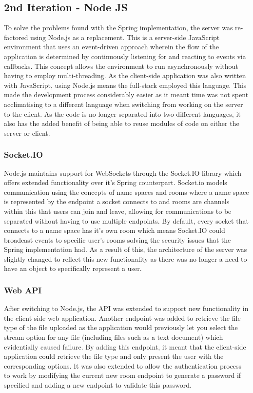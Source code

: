 \documentclass[]{report}
\begin{document}
			\subsection{2nd Iteration - Node JS}
			To solve the problems found with the Spring implementation, the server was re-factored using Node.js as a replacement. This is a server-side JavaScript environment that uses an event-driven approach wherein the flow of the application is determined by continuously listening for and reacting to events via callbacks. This concept allows the environment to run asynchronously without having to employ multi-threading. As the client-side application was also written with JavaScript, using Node.js means the full-stack employed this language. This made the development process considerably easier as it meant time was not spent acclimatising to a different language when switching from working on the server to the client. As the code is no longer separated into two different languages, it also has the added benefit of being able to reuse modules of code on either the server or client.
				\subsubsection{Socket.IO}
				Node.js maintains support for WebSockets through the Socket.IO library which offers extended functionality over it's Spring counterpart. Socket.io models communication using the concepts of name spaces and rooms where a name space is represented by the endpoint a socket connects to and rooms are channels within this that users can join and leave, allowing for communications to be separated without having to use multiple endpoints. By default, every socket that connects to a name space has it's own room which means Socket.IO could broadcast events to specific user's rooms solving the security issues that the Spring implementation had. As a result of this, the architecture of the server was slightly changed to reflect this new functionality as there was no longer a need to have an object to specifically represent a user. 
				
				\subsubsection{Web API}
				After switching to Node.js, the API was extended to support new functionality in the client side web application. Another endpoint was added to retrieve the file type of the file uploaded as the application would previously let you select the stream option for any file (including files such as a text document) which evidentially caused failure. By adding this endpoint, it meant that the client-side application could retrieve the file type and only present the user with the corresponding options. It was also extended to allow the authentication process to work by modifying the current new room endpoint to generate a password if specified and adding a new endpoint to validate this password. 
				
\end{document}
